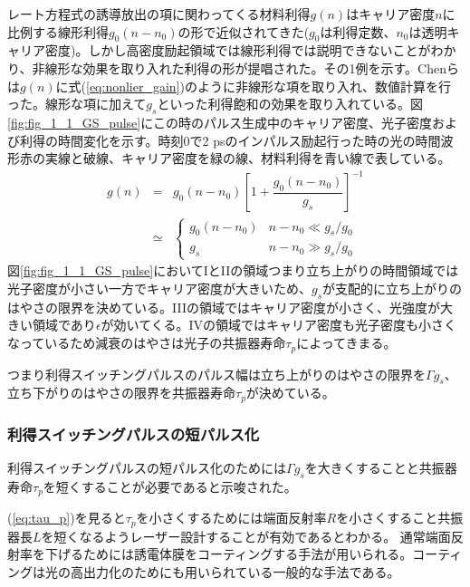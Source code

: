 レート方程式の誘導放出の項に関わってくる材料利得$g(n)$はキャリア密度$n$に比例する線形利得$g_{0}(n-n_{0})$の形で近似されてきた($g_{0}$は利得定数、$n_{0}$は透明キャリア密度)。しかし高密度励起領域では線形利得では説明できないことがわかり、非線形な効果を取り入れた利得の形が提唱された。その1例を示す。Chenらは$g(n)$に式(\ref{eq:nonlier_gain})のように非線形な項を取り入れ、数値計算を行った\cite{ref_1_1_GS}。線形な項に加えて$g_{s}$といった利得飽和の効果を取り入れている。図\ref{fig:fig_1_1_GS_pulse}にこの時のパルス生成中のキャリア密度、光子密度および利得の時間変化を示す。時刻0で2 psのインパルス励起行った時の光の時間波形赤の実線と破線、キャリア密度を緑の線、材料利得を青い線で表している。
\begin{eqnarray}
\label{eq:nonlier_gain}
g(n)&=&g_{0}(n-n_{0})\left[1+\dfrac{g_{0}(n-n_{0})}{g_{s}}\right]^{-1}\\
&\simeq &\left\{
\begin{array}{ll}
 g_{0}(n-n_{0}) & n-n_{0}\ll g_{s}/g_{0}\nonumber \\
g_{s} & n-n_{0}\gg g_{s}/g_{0}\nonumber
\end{array}
\right.
\end{eqnarray}
図\ref{fig:fig_1_1_GS_pulse}においてIとIIの領域つまり立ち上がりの時間領域では光子密度が小さい一方でキャリア密度が大きいため、$g_{s}$が支配的に立ち上がりのはやさの限界を決めている。IIIの領域ではキャリア密度が小さく、光強度が大きい領域であり$\epsilon$が効いてくる。IVの領域ではキャリア密度も光子密度も小さくなっているため減衰のはやさは光子の共振器寿命$\tau_{p}$によってきまる。

つまり利得スイッチングパルスのパルス幅は立ち上がりのはやさの限界を$\Gamma g_{s}$、立ち下がりのはやさの限界を共振器寿命$\tau_{p}$が決めている。
\newpage

\subsubsection{利得スイッチングパルスの短パルス化}
利得スイッチングパルスの短パルス化のためには$\Gamma g_{s}$を大きくすることと共振器寿命$\tau_{p}$を短くすることが必要であると示唆された。

(\ref{eq:tau_p})を見ると$\tau_{p}$を小さくするためには端面反射率$R$を小さくすること共振器長$L$を短くなるようレーザー設計することが有効であるとわかる。
通常端面反射率を下げるためには誘電体膜をコーティングする手法が用いられる。コーティングは光の高出力化のためにも用いられている一般的な手法である。


